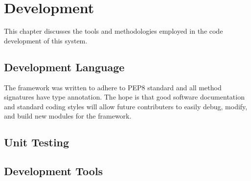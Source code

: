 \chapter{Development}
\label{chap:dev}

This chapter discusses the tools and methodologies employed in the code development of this system. 

\section{Development  Language}

The framework was written to adhere to PEP8 standard and all method signatures have type annotation. The hope is that good software documentation and standard coding styles will allow future contributers to easily debug, modify, and build new modules for the framework. 

\section{Unit Testing}


\section{Development  Tools}
\label{sec:devtools}



